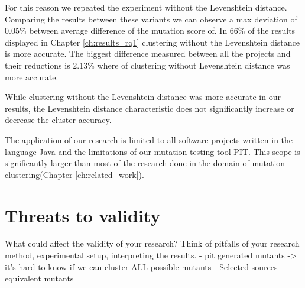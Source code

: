 \documentclass[../main]{subfiles}
\begin{document}
For this reason we repeated the experiment without the Levenshtein distance.
Comparing the results between these variants we can observe a max deviation of 0.05\% between average difference of the mutation score of.
In 66\% of the results displayed in Chapter \ref{ch:results_rq1} clustering without the Levenshtein distance is more accurate.
The biggest difference measured between all the projects and their reductions is 2.13\% where of clustering without Levenshtein distance was more accurate.
\begin{finding}
    While clustering without the Levenshtein distance was more accurate in our results, the Levenshtein distance characteristic does not significantly increase or decrease the cluster accuracy.
\end{finding}




The application of our research is limited to all software projects written in the language Java and the limitations of our mutation testing tool PIT\cite{pit}.
This scope is significantly larger than most of the research done in the domain of mutation clustering(Chapter \ref{ch:related_work}).

\section{Threats to validity}
What could affect the validity of your research? Think of pitfalls of your research method, experimental setup, interpreting the results.
- pit generated mutants -> it's hard to know if we can cluster ALL possible mutants
- Selected sources
- equivalent mutants
\end{document}
